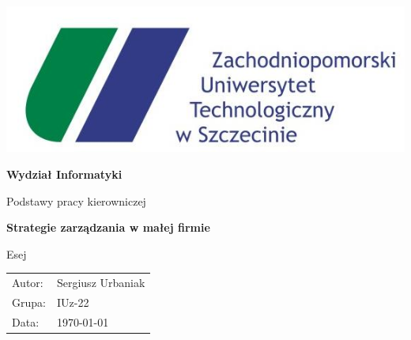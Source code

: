 \documentclass[pointlessnumbers, abstracton, headsepline, a4paper]{scrartcl}
\let\myTOC\tableofcontents
\renewcommand\tableofcontents{\myTOC\clearpage\pagenumbering{arabic}}
\begin{document}
\begin{titlepage}

\begin{center}
\includegraphics[scale=0.5]{logos/zut.jpg}
\par
\end{center}

\begin{center}
\textsf{\textbf{\LARGE Wydział Informatyki}}
\end{center}{\LARGE}

\vspace{1.5cm}

\begin{center}
\textsf{\Large Podstawy pracy kierowniczej}
\end{center}

\begin{center}
\textsf{\textbf{\Large Strategie zarządzania  w małej firmie}}
\end{center}

\begin{center}
\textsf{\large Esej}
\end{center}

\vspace{3.5cm}

\begin{center}
\begin{tabular}{ll}
Autor: & Sergiusz Urbaniak\tabularnewline
Grupa: & IUz-22\tabularnewline
Data: & \today\tabularnewline
\end{tabular}
\end{center}

\end{titlepage}





\end{document}
